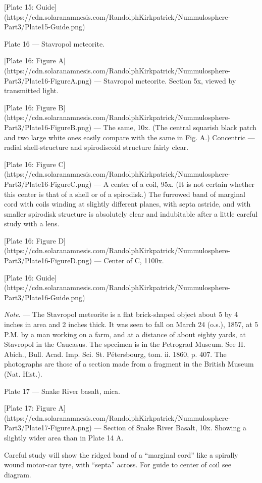 \documentclass[a4paper, 12pt, oneside]{article}
\begin{document}
[Plate 15: Guide](https://cdn.solaranamnesis.com/RandolphKirkpatrick/Nummulosphere-Part3/Plate15-Guide.png)

Plate 16 --- Stavropol meteorite.

[Plate 16: Figure A](https://cdn.solaranamnesis.com/RandolphKirkpatrick/Nummulosphere-Part3/Plate16-FigureA.png) --- Stavropol meteorite. Section 5x, viewed by transmitted light.

[Plate 16: Figure B](https://cdn.solaranamnesis.com/RandolphKirkpatrick/Nummulosphere-Part3/Plate16-FigureB.png) --- The same, 10x. (The central squarish black patch and two large white ones easily compare with the same in Fig. A.) Concentric --- radial shell-structure and spirodiscoid structure fairly clear.

[Plate 16: Figure C](https://cdn.solaranamnesis.com/RandolphKirkpatrick/Nummulosphere-Part3/Plate16-FigureC.png) --- A center of a coil, 95x. (It is not certain whether this center is that of a shell or of a spirodisk.) The furrowed band of marginal cord with coils winding at slightly different planes, with septa astride, and with smaller spirodisk structure is absolutely clear and indubitable after a little careful study with a lens.

[Plate 16: Figure D](https://cdn.solaranamnesis.com/RandolphKirkpatrick/Nummulosphere-Part3/Plate16-FigureD.png) --- Center of C, 1100x.

[Plate 16: Guide](https://cdn.solaranamnesis.com/RandolphKirkpatrick/Nummulosphere-Part3/Plate16-Guide.png)

\emph{Note}. --- The Stavropol meteorite is a flat brick-shaped object about 5 by 4 inches in area and 2 inches thick. It was seen to fall on March 24 (o.s.), 1857, at 5 P.M. by a man working on a farm, and at a distance of about eighty yards, at Stavropol in the Caucasus. The specimen is in the Petrograd Museum. See H. Abich., Bull. Acad. Imp. Sci. St. Pétersbourg, tom. ii. 1860, p. 407. The photographs are those of a section made from a fragment in the British Museum (Nat. Hist.).

Plate 17 --- Snake River basalt, mica.

[Plate 17: Figure A](https://cdn.solaranamnesis.com/RandolphKirkpatrick/Nummulosphere-Part3/Plate17-FigureA.png) --- Section of Snake River Basalt, 10x. Showing a slightly wider area than in Plate 14 A.

Careful study will show the ridged band of a ``marginal cord'' like a spirally wound motor-car tyre, with ``septa'' across. For guide to center of coil see diagram.
\end{document}
